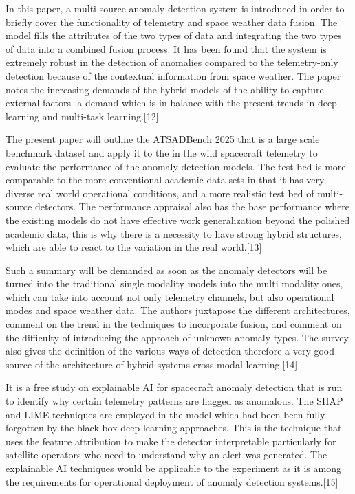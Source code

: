 \documentclass[conference]{IEEEtran}
\begin{document}
In this paper, a multi-source anomaly detection system is introduced in order to briefly cover the functionality of telemetry and space weather data fusion. The model fills the attributes of the two types of data and integrating the two types of data into a combined fusion process. It has been found that the system is extremely robust in the detection of anomalies compared to the telemetry-only detection because of the contextual information from space weather. The paper notes the increasing demands of the hybrid models of the ability to capture external factors- a demand which is in balance with the present trends in deep learning and multi-task learning.[12]

The present paper will outline the ATSADBench 2025 that is a large scale benchmark dataset and apply it to the in the wild spacecraft telemetry to evaluate the performance of the anomaly detection models. The test bed is more comparable to the more conventional academic data sets in that it has very diverse real world operational conditions, and a more realistic test bed of multi-source detectors. The performance appraisal also has the base performance where the existing models do not have effective work generalization beyond the polished academic data, this is why there is a necessity to have strong hybrid structures, which are able to react to the variation in the real world.[13]

Such a summary will be demanded as soon as the anomaly detectors will be turned into the traditional single modality models into the multi modality ones, which can take into account not only telemetry channels, but also operational modes and space weather data. The authors juxtapose the different architectures, comment on the trend in the techniques to incorporate fusion, and comment on the difficulty of introducing the approach of unknown anomaly types. The survey also gives the definition of the various ways of detection therefore a very good source of the architecture of hybrid systems cross modal learning.[14]

It is a free study on explainable AI for spacecraft anomaly detection that is run to identify why certain telemetry patterns are flagged as anomalous. The SHAP and LIME techniques are employed in the model which had been been fully forgotten by the black-box deep learning approaches. This is the technique that uses the feature attribution to make the detector interpretable particularly for satellite operators who need to understand why an alert was generated. The explainable AI techniques would be applicable to the experiment as it is among the requirements for operational deployment of anomaly detection systems.[15]
\end{document}
